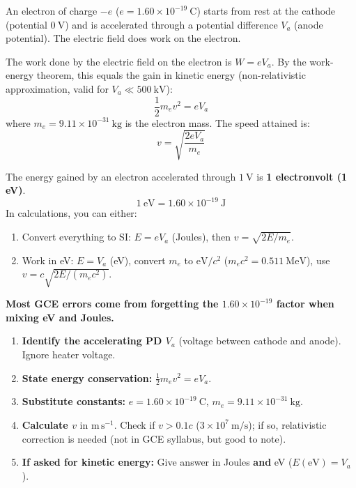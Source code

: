 \documentclass[11pt]{article}
\begin{document}
An electron of charge $-e$ ($e = 1.60 \times 10^{-19}\ \mathrm{C}$) starts from rest at the cathode (potential $0\ \mathrm{V}$) and is accelerated through a potential difference $V_a$ (anode potential). The electric field does work on the electron.

\begin{propriete}
The work done by the electric field on the electron is $W = e V_a$. By the work-energy theorem, this equals the gain in kinetic energy (non-relativistic approximation, valid for $V_a \ll 500\ \mathrm{kV}$):
\[ \frac{1}{2} m_e v^2 = e V_a \]
where $m_e = 9.11 \times 10^{-31}\ \mathrm{kg}$ is the electron mass. The speed attained is:
\[ v = \sqrt{\frac{2 e V_a}{m_e}} \]
\end{propriete}

\begin{attention}
The energy gained by an electron accelerated through $1\ \mathrm{V}$ is \textbf{1 electronvolt (1 eV)}.
\[ 1\ \mathrm{eV} = 1.60 \times 10^{-19}\ \mathrm{J} \]
In calculations, you can either:
\begin{enumerate}
\item Convert everything to SI: $E = e V_a$ (Joules), then $v = \sqrt{2E/m_e}$.
\item Work in eV: $E = V_a$ (eV), convert $m_e$ to $\mathrm{eV}/c^2$ ($m_e c^2 = 0.511\ \mathrm{MeV}$), use $v = c\sqrt{2E/(m_ec^2)}$.
\end{enumerate}
\textbf{Most GCE errors come from forgetting the $1.60 \times 10^{-19}$ factor when mixing eV and Joules.}
\end{attention}

\begin{methode}
\begin{enumerate}
\item \textbf{Identify the accelerating PD $V_a$} (voltage between cathode and anode). Ignore heater voltage.
\item \textbf{State energy conservation:} $\frac{1}{2}m_e v^2 = e V_a$.
\item \textbf{Substitute constants:} $e = 1.60 \times 10^{-19}\ \mathrm{C}$, $m_e = 9.11 \times 10^{-31}\ \mathrm{kg}$.
\item \textbf{Calculate $v$} in $\mathrm{m\,s^{-1}}$. Check if $v > 0.1c$ ($3 \times 10^7\ \mathrm{m/s}$); if so, relativistic correction is needed (not in GCE syllabus, but good to note).
\item \textbf{If asked for kinetic energy:} Give answer in Joules \textbf{and} eV ($E(\mathrm{eV}) = V_a$).
\end{enumerate}
\end{methode}
\end{document}
